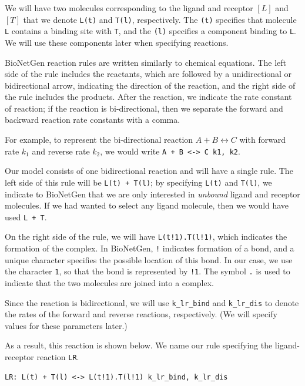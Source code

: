 We will have two molecules corresponding to the ligand and receptor $[L]$ and $[T]$ that we denote \texttt{L(t)} and \texttt{T(l)}, respectively. The \texttt{(t)} specifies that molecule \texttt{L} contains a binding site with \texttt{T}, and the \texttt{(l)} specifies a component binding to \texttt{L}. We will use these components later when specifying reactions.

BioNetGen reaction rules are written similarly to chemical equations. The left side of the rule includes the reactants, which are followed by a unidirectional or bidirectional arrow, indicating the direction of the reaction, and the right side of the rule includes the products. After the reaction, we indicate the rate constant of reaction; if the reaction is bi-directional, then we separate the forward and backward reaction rate constants with a comma.

For example, to represent the bi-directional reaction $A + B \longleftrightarrow C$ with forward rate $k_1$ and reverse rate $k_2$, we would write \texttt{A + B <-> C k1, k2}.

Our model consists of one bidirectional reaction and will have a single rule. The left side of this rule will be \texttt{L(t) + T(l)}; by specifying \texttt{L(t)} and \texttt{T(l)}, we indicate to BioNetGen that we are only interested in \textit{unbound} ligand and receptor molecules. If we had wanted to select any ligand molecule, then we would have used \texttt{L + T}.

On the right side of the rule, we will have \texttt{L(t!1).T(l!1)}, which indicates the formation of the complex. In BioNetGen, \texttt{!} indicates formation of a bond, and a unique character specifies the possible location of this bond. In our case, we use the character \texttt{1}, so that the bond is represented by \texttt{!1}. The symbol \texttt{.} is used to indicate that the two molecules are joined into a complex.

Since the reaction is bidirectional, we will use \texttt{k\_lr\_bind} and \texttt{k\_lr\_dis} to denote the rates of the forward and reverse reactions, respectively. (We will specify values for these parameters later.)

As a result, this reaction is shown below. We name our rule specifying the ligand-receptor reaction \texttt{LR}.

\begin{verbatim}
LR: L(t) + T(l) <-> L(t!1).T(l!1) k_lr_bind, k_lr_dis
\end{verbatim}

